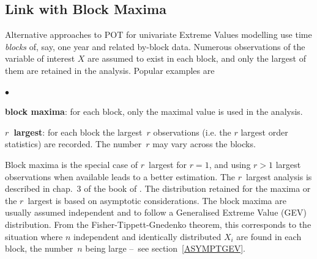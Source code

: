 \documentclass[a4paper]{report}
\begin{document}

\subsection{Link with Block Maxima}
%

Alternative approaches to POT for univariate Extreme Values modelling
use time \textit{blocks} 
of, say, one year and related by-block data. Numerous
observations of the variable of interest $X$ are assumed to exist in
each block, and only the largest of them are retained in the
analysis. Popular examples are

\begin{list}{$\bullet$}{\setlength{\itemsep}{2pt}\setlength{\topsep}{2pt}}
  
\item \textbf{block maxima}: for each block, only the maximal value is
  used in the analysis.

\item \textbf{ $r$~largest}: for each block the largest~$r$
  observations (i.e. the $r$ largest order statistics) are recorded.
  The number~$r$ may vary across the blocks.  

\end{list}
Block maxima is the special case of $r$~largest for $r=1$, and using
$r>1$ largest observations when available leads to a better
estimation. The $r$~largest analysis is described in chap.~3 of the
book of \citet{COLES}. The distribution retained for the maxima or the
$r$~largest is based on asymptotic considerations. The block maxima
are usually assumed independent and to follow a Generalised Extreme
Value (GEV) distribution. From the Fisher-Tippett-Gnedenko theorem, 
this corresponds to the situation where $n$
independent and identically distributed $X_i$ are found in each block,
the number~$n$ being large --~see section~\ref{ASYMPTGEV}.



\end{document}
